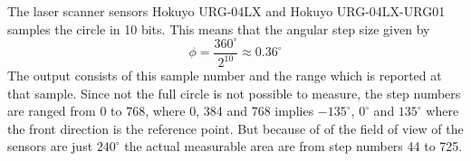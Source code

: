\documentclass[a4paper, 10pt]{article}
\begin{document}
The laser scanner sensors Hokuyo URG-04LX and Hokuyo URG-04LX-URG01 samples the circle in 10 bits. 
This means that the angular step size given by 
\begin{equation}
    \phi = \frac{360^\circ}{2^{10}} \approx 0.36^\circ
\end{equation}
The output consists of this sample number and the range which is reported at that sample. 
Since not the full circle is not possible to measure, the step numbers are ranged from 0 to
768, where 0, 384 and 768 implies $-135^\circ$, $0^\circ$ and $135^\circ$ where the front
direction is the reference point. But because of of the field of view of the sensors are
just $240^\circ$ the actual measurable area are from step numbers 44 to 725.
\end{document}

